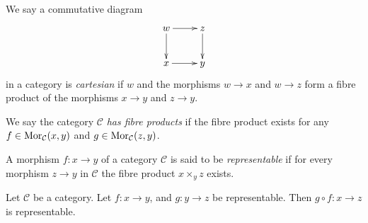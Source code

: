 \begin{definition}
\label{definition-cartesian}
We say a commutative diagram
$$
\xymatrix{
w \ar[r] \ar[d] &
z \ar[d] \\
x \ar[r] &
y
}
$$
in a category is {\it cartesian} if $w$ and the morphisms $w \to x$ and
$w \to z$ form a fibre product of the morphisms $x \to y$ and $z \to y$.
\end{definition}

\begin{definition}
\label{definition-has-fibre-products}
We say the category $\mathcal{C}$ {\it has fibre products} if
the fibre product exists for any $f\in \mathop{\mathrm{Mor}}\nolimits_{\mathcal C}(x, y)$
and $g\in \mathop{\mathrm{Mor}}\nolimits_{\mathcal C}(z, y)$.
\end{definition}

\begin{definition}
\label{definition-representable-morphism}
A morphism $f : x \to y$ of a category $\mathcal{C}$ is said to be
{\it representable} if for every morphism $z \to y$
in $\mathcal{C}$ the fibre product $x \times_y z$ exists.
\end{definition}

\begin{lemma}
\label{lemma-composition-representable}
Let $\mathcal{C}$ be a category.
Let $f : x \to y$, and $g : y \to z$ be representable.
Then $g \circ f : x \to z$ is representable.
\end{lemma}

